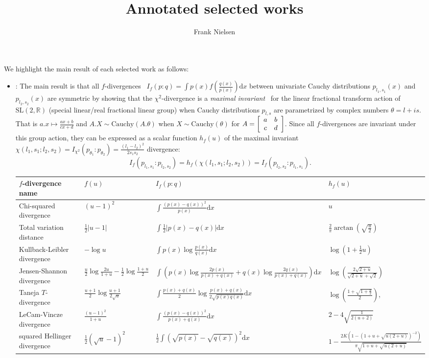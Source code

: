 \documentclass{article}
\title{Annotated selected works}
\author{Frank Nielsen  
\orcidlink{0000-0001-5728-0726}}
\date{ }
\def\mycite#1{\bibentry{#1} \nocite{#1}}
\def\Cauchy{\mathrm{Cauchy}}
\def\dx{\mathrm{d}x}
\def\SL{\mathrm{SL}}
\def\mattwotwo#1#2#3#4{{\left[\begin{array}{cc}#1&#2\cr#3&#4\end{array}\right]}}
\def\bbR{\mathbb{R}}
\begin{document}
\maketitle

We highlight the main result of each selected work as follows:

\begin{itemize}
	\item \mycite{fdivCauchy-2023}:
	The main result is that all $f$-divergences~\cite{Csiszar-1967} $I_f(p:q)=\int p(x)f\left(\frac{q(x)}{p(x)}\right) \dx$ between univariate Cauchy distributions $p_{l_1,s_1}(x)$ and $p_{l_2,s_2}(x)$ are symmetric by showing that the $\chi^2$-divergence is a {\em maximal invariant}~\cite{Eaton-1989} for the linear fractional transform action of $\SL(2,\bbR)$ (special linear/real fractional linear group) when Cauchy distributions $p_{l,s}$ are parametrized by complex numbers $\theta=l+is$. 
	That is $a.x\mapsto \frac{ax+b}{cx+d}$ and  $A.X\sim\Cauchy(A.\theta)$ when $X\sim\Cauchy(\theta)$ for $A=\mattwotwo{a}{b}{c}{d}$.
	Since all $f$-divergences are invariant under this group action, they can be expressed as a scalar function $h_f(u)$ of the maximal invariant 
	$\chi(l_1,s_1;l_2,s_2)=I_{\chi^2}(p_{\theta_1}:p_{\theta_2})=\frac{(l_1-l_2)^2}{2s_1s_2}$ divergence: 
	$$
	I_f(p_{l_1,s_1}:p_{l_2,s_2})=h_f(\chi(l_1,s_1;l_2,s_2))=I_f(p_{l_2,s_2}:p_{l_1,s_1}).
		$$
	 
{\tiny\renewcommand{\arraystretch}{1.5}
\begin{tabular}{|l|l|l|l|}\hline
$f$-divergence name & $f(u)$ & $I_f(p:q)$ & $h_f(u)$  \\ \hline\hline
Chi-squared divergence & $(u-1)^2$ & $\int \frac{(p(x)-q(x))^2}{p(x)}\dx$ &$u$\\
Total variation distance & $\frac{1}{2}|u-1|$  & $\int \frac{1}{2}|p(x)-q(x)|\dx$  & $\frac{2}{\pi}\arctan\left(\sqrt{\frac{u}{2}}\right)$\\
Kullback-Leibler divergence & $-\log u$ & $\int p(x)\log\frac{p(x)}{q(x)}\dx$ &  $\log(1+\frac{1}{2}u)$\\
Jensen-Shannon divergence & $\frac{u}{2}\log\frac{2u}{1+u}-\frac{1}{2}\log\frac{1+u}{2}$ & $\int \left(p(x)\log\frac{2p(x)}{p(x)+q(x)} 
+q(x)\log\frac{2q(x)}{p(x)+q(x)}\right)\dx$ & $\log\left( \frac{2\sqrt{2+u}}{\sqrt{2+u}+\sqrt{2}} \right)$\\
Taneja $T$-divergence & $\frac{u+1}{2}\log\frac{u+1}{2\sqrt{u}}$ & $\int \frac{p(x)+q(x)}{2}\log  \frac{p(x)+q(x)}{2 \sqrt{p(x) q(x)}} \dx$  &$\log \left( \frac{1+\sqrt{1+\frac{u}{2}}}{2} \right)$,\\
LeCam-Vincze divergence & $\frac{(u-1)^2}{1+u}$ & $\int \frac{(p(x)-q(x))^2}{p(x)+q(x)} \dx$ & $2-4\sqrt{\frac{1}{2(u+2)}}$\\
squared Hellinger divergence & $\frac{1}{2}(\sqrt{u}-1)^2$ & $\frac{1}{2} \int \left(\sqrt{p(x)}-\sqrt{q(x)}\right)^2\dx$ & $1-  \frac{2 K\left( 1 - \left(1+ u + \sqrt{u(2+u)}\right)^{-2}\right)}{\pi \sqrt{1+u + \sqrt{u(2+u)}}}$ \\ \hline
\end{tabular}
}


\end{itemize}
\end{document}

